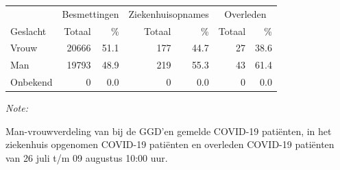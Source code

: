 \documentclass[
  english,
  man,floatsintext]{apa6}
\begin{document}
\begin{table}
\centering\begingroup\fontsize{11}{13}\selectfont

\begin{threeparttable}
\begin{tabular}{lrrrrrr}
\toprule
\multicolumn{1}{c}{ } & \multicolumn{2}{c}{Besmettingen} & \multicolumn{2}{c}{Ziekenhuisopnames} & \multicolumn{2}{c}{Overleden} \\
\cmidrule(l{3pt}r{3pt}){2-3} \cmidrule(l{3pt}r{3pt}){4-5} \cmidrule(l{3pt}r{3pt}){6-7}
Geslacht & Totaal & \% & Totaal & \% & Totaal & \%\\
\midrule
Vrouw & 20666 & 51.1 & 177 & 44.7 & 27 & 38.6\\
Man & 19793 & 48.9 & 219 & 55.3 & 43 & 61.4\\
Onbekend & 0 & 0.0 & 0 & 0.0 & 0 & 0.0\\
\bottomrule
\end{tabular}
\begin{tablenotes}
\item \textit{Note: } 
\item Man-vrouwverdeling van bij de GGD’en gemelde COVID-19 patiënten, in het ziekenhuis opgenomen COVID-19 patiënten en overleden COVID-19 patiënten van 26 juli t/m 09 augustus 10:00 uur.
\end{tablenotes}
\end{threeparttable}
\endgroup{}
\end{table}
\newpage
\end{document}
